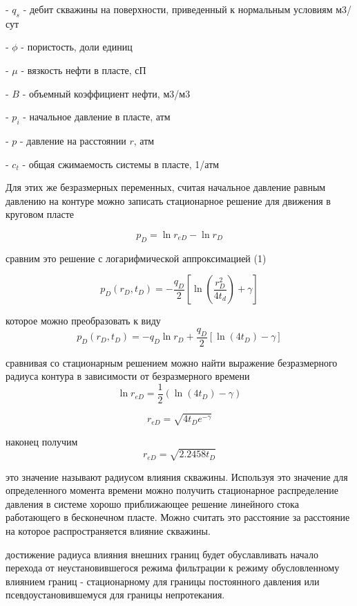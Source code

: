 \documentclass[oneside, openany]{memoir}
\begin{document}
	- $q_s$ - дебит скважины на поверхности, приведенный к нормальным условиям м3/сут
	
	- $\phi$ - пористость, доли единиц
	
	- $\mu$ - вязкость нефти в пласте, сП
	
	- $B$ - объемный коэффициент нефти, м3/м3
	
	- $p_i$ - начальное давление в пласте, атм
	
	- $p$ - давление на расстоянии $r$, атм
	
	- $c_t$ - общая сжимаемость системы в пласте, 1/атм
	
	Для этих же безразмерных переменных, считая начальное давление равным давлению на контуре можно записать стационарное решение для движения в круговом пласте
	
	$$p_D = \ln r_{eD} - \ln r_D $$
	
	сравним это решение с логарифмической аппроксимацией (1)
	
	$$p_D(r_D,t_D) = - \frac{q_D}{2} \left[ \ln \left( \dfrac{ r_D^2}{4t_d} \right) +\gamma \right] $$
	
	которое можно преобразовать к виду
	$$p_D(r_D,t_D) = - q_D \ln r_D  + \frac{q_D}{2} \left[ \ln(4t_D)   -\gamma \right] $$
	
	сравнивая со стационарным решением можно найти выражение безразмерного радиуса контура в зависимости от безразмерного времени
	$$\ln r_{eD} = \frac{1}{2}(\ln(4t_D)-\gamma) $$
	
	$$r_{eD} =  \sqrt { 4t_D e^{-\gamma} }  $$
	
	наконец получим
	$$r_{eD} = \sqrt {2.2458 t_D} $$
	
	это значение называют радиусом влияния скважины. Используя это значение для определенного момента времени можно получить стационарное распределение давления в системе хорошо приближающее решение линейного стока работающего в бесконечном пласте. Можно считать это расстояние за расстояние на которое распространяется влияние скважины.
	
	достижение радиуса влияния внешних границ будет обуславливать начало перехода от неустановившегося режима фильтрации к режиму обусловленному влиянием границ - стационарному для границы постоянного давления или псевдоустановившемуся для границы непротекания.
	
\end{document}
